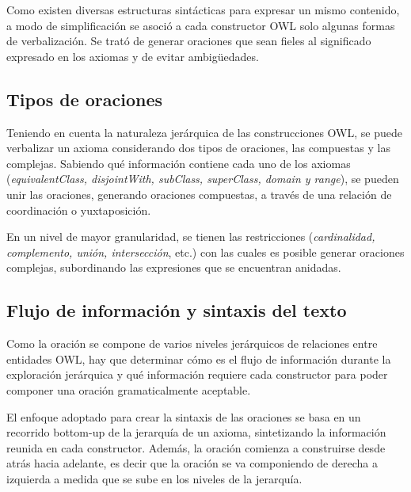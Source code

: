 Como existen diversas estructuras sintácticas para expresar un mismo contenido, a modo de simplificación se asoció a cada constructor OWL solo algunas formas de verbalización. Se trató de generar oraciones que sean fieles al significado expresado en los axiomas y de evitar ambigüedades.

\subsection{Tipos de oraciones}
Teniendo en cuenta la naturaleza jerárquica de las construcciones OWL, se puede verbalizar un axioma considerando dos tipos de oraciones, las compuestas y las complejas. Sabiendo qué información contiene cada uno de los axiomas (\emph{equivalentClass, disjointWith, subClass, superClass, domain y range}), se pueden unir las oraciones, generando oraciones compuestas, a través de una relación de coordinación o yuxtaposición.

En un nivel de mayor granularidad, se tienen las restricciones (\emph{cardinalidad, complemento, unión, intersección}, etc.) con las cuales es posible generar oraciones complejas, subordinando las expresiones que se encuentran anidadas.

\subsection{Flujo de información y sintaxis del texto}
Como la oración se compone de varios niveles jerárquicos de relaciones entre entidades OWL, hay que determinar cómo es el flujo de información durante la exploración jerárquica y qué información requiere cada constructor para poder componer una oración gramaticalmente aceptable. 

El enfoque adoptado para crear la sintaxis de las oraciones se basa en un recorrido bottom-up de la jerarquía de un axioma, sintetizando la información reunida en cada constructor. Además, la oración comienza a construirse desde atrás hacia adelante, es decir que la oración se va componiendo de derecha a izquierda a medida que se sube en los niveles de la jerarquía.

